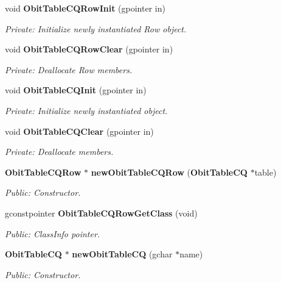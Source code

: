 \begin{CompactItemize}
\item 
void {\bf Obit\-Table\-CQRow\-Init} (gpointer in)
\begin{CompactList}\small\item\em Private: Initialize newly instantiated Row object. \item\end{CompactList}\item 
void {\bf Obit\-Table\-CQRow\-Clear} (gpointer in)
\begin{CompactList}\small\item\em Private: Deallocate Row members. \item\end{CompactList}\item 
void {\bf Obit\-Table\-CQInit} (gpointer in)
\begin{CompactList}\small\item\em Private: Initialize newly instantiated object. \item\end{CompactList}\item 
void {\bf Obit\-Table\-CQClear} (gpointer in)
\begin{CompactList}\small\item\em Private: Deallocate members. \item\end{CompactList}\item 
{\bf Obit\-Table\-CQRow} $\ast$ {\bf new\-Obit\-Table\-CQRow} ({\bf Obit\-Table\-CQ} $\ast$table)
\begin{CompactList}\small\item\em Public: Constructor. \item\end{CompactList}\item 
gconstpointer {\bf Obit\-Table\-CQRow\-Get\-Class} (void)
\begin{CompactList}\small\item\em Public: Class\-Info pointer. \item\end{CompactList}\item 
{\bf Obit\-Table\-CQ} $\ast$ {\bf new\-Obit\-Table\-CQ} (gchar $\ast$name)
\begin{CompactList}\small\item\em Public: Constructor. \item\end{CompactList}\item 

\end{CompactItemize}

